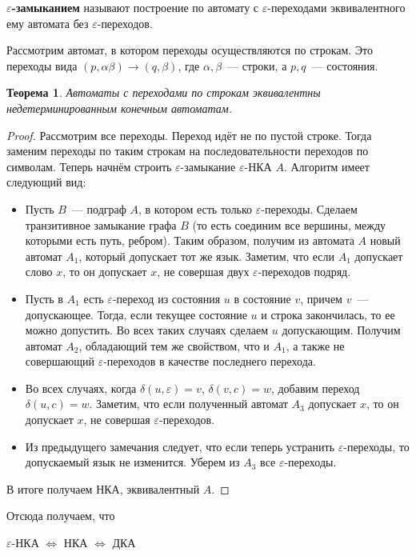 \documentclass[a4paper,12pt]{article}
\newtheorem*{theorem}{Теорема}
\begin{document}
	\textbf{\(\varepsilon\)-замыканием} называют построение по автомату с \(\varepsilon\)-переходами эквивалентного ему автомата без \(\varepsilon\)-переходов.
	
	Рассмотрим автомат, в котором переходы осуществляются по строкам. Это переходы вида \((p, \alpha\beta) \to (q, \beta)\), где \(\alpha,\beta\)~--- строки, а \(p, q\)~--- состояния.
	
	\begin{theorem}
		Автоматы с переходами по строкам эквивалентны недетерминированным конечным автоматам.
	\end{theorem}
	\begin{proof}
		Рассмотрим все переходы. Переход идёт не по пустой строке. Тогда заменим переходы по таким строкам на последовательности переходов по символам. Теперь начнём строить \(\varepsilon\)-замыкание \(\varepsilon\)-НКА \(A\). Алгоритм имеет следующий вид:
		\begin{itemize}
			\item Пусть \(B\)~--- подграф \(A\), в котором есть только \(\varepsilon\)-переходы. Сделаем транзитивное замыкание графа \(B\) (то есть соединим все вершины, между которыми есть путь, ребром). Таким образом, получим из автомата \(A\) новый автомат \(A_1\), который допускает тот же язык. Заметим, что если \(A_1\) допускает слово \(x\), то он допускает \(x\), не совершая двух \(\varepsilon\)-переходов подряд.
			\item Пусть в \(A_1\) есть \(\varepsilon\)-переход из состояния \(u\) в состояние \(v\), причем \(v\)~--- допускающее. Тогда, если текущее состояние \(u\) и строка закончилась, то ее можно допустить. Во всех таких случаях сделаем \(u\) допускающим. Получим автомат \(A_2\), обладающий тем же свойством, что и \(A_1\), а также не совершающий \(\varepsilon\)-переходов в качестве последнего перехода.
			\item Во всех случаях, когда \(\delta(u,\varepsilon)=v\), \(\delta(v,c)=w\), добавим переход \(\delta(u,c)=w\). Заметим, что если полученный автомат \(A_3\) допускает \(x\), то он допускает \(x\), не совершая \(\varepsilon\)-переходов.
			\item Из предыдущего замечания следует, что если теперь устранить \(\varepsilon\)-переходы, то допускаемый язык не изменится. Уберем из \(A_3\) все \(\varepsilon\)-переходы.
		\end{itemize}
		В итоге получаем НКА, эквивалентный \(A\).
	\end{proof}
	Отсюда получаем, что 
	\begin{center}
		\(\varepsilon\)-НКА \(\iff\) НКА \(\iff\) ДКА
	\end{center}
	
\end{document}
